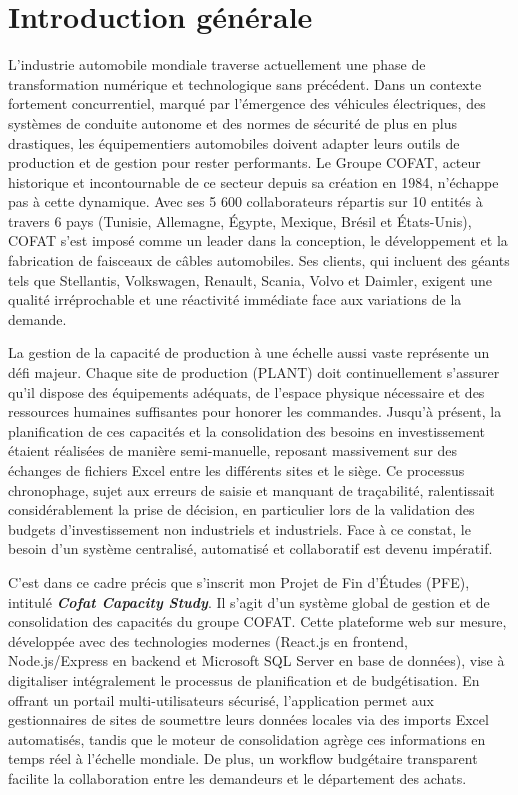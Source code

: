 \chapter*{Introduction générale}

L'industrie automobile mondiale traverse actuellement une phase de transformation numérique et technologique sans précédent. Dans un contexte fortement concurrentiel, marqué par l'émergence des véhicules électriques, des systèmes de conduite autonome et des normes de sécurité de plus en plus drastiques, les équipementiers automobiles doivent adapter leurs outils de production et de gestion pour rester performants. Le Groupe COFAT, acteur historique et incontournable de ce secteur depuis sa création en 1984, n'échappe pas à cette dynamique. Avec ses 5 600 collaborateurs répartis sur 10 entités à travers 6 pays (Tunisie, Allemagne, Égypte, Mexique, Brésil et États-Unis), COFAT s'est imposé comme un leader dans la conception, le développement et la fabrication de faisceaux de câbles automobiles. Ses clients, qui incluent des géants tels que Stellantis, Volkswagen, Renault, Scania, Volvo et Daimler, exigent une qualité irréprochable et une réactivité immédiate face aux variations de la demande.

La gestion de la capacité de production à une échelle aussi vaste représente un défi majeur. Chaque site de production (PLANT) doit continuellement s'assurer qu'il dispose des équipements adéquats, de l'espace physique nécessaire et des ressources humaines suffisantes pour honorer les commandes. Jusqu'à présent, la planification de ces capacités et la consolidation des besoins en investissement étaient réalisées de manière semi-manuelle, reposant massivement sur des échanges de fichiers Excel entre les différents sites et le siège. Ce processus chronophage, sujet aux erreurs de saisie et manquant de traçabilité, ralentissait considérablement la prise de décision, en particulier lors de la validation des budgets d'investissement non industriels et industriels. Face à ce constat, le besoin d'un système centralisé, automatisé et collaboratif est devenu impératif. 

C'est dans ce cadre précis que s'inscrit mon Projet de Fin d'Études (PFE), intitulé \textbf{\textit{Cofat Capacity Study}}. Il s'agit d'un système global de gestion et de consolidation des capacités du groupe COFAT. Cette plateforme web sur mesure, développée avec des technologies modernes (React.js en frontend, Node.js/Express en backend et Microsoft SQL Server en base de données), vise à digitaliser intégralement le processus de planification et de budgétisation. En offrant un portail multi-utilisateurs sécurisé, l'application permet aux gestionnaires de sites de soumettre leurs données locales via des imports Excel automatisés, tandis que le moteur de consolidation agrège ces informations en temps réel à l'échelle mondiale. De plus, un workflow budgétaire transparent facilite la collaboration entre les demandeurs et le département des achats.

